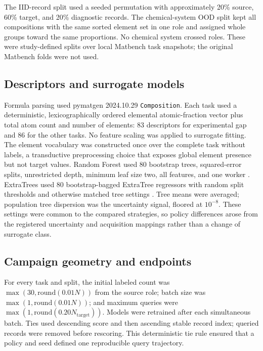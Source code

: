 \documentclass[10pt]{article}
\begin{document}
The IID-record split used a seeded permutation with approximately 20\% source,
60\% target, and 20\% diagnostic records. The chemical-system OOD split kept
all compositions with the same sorted element set in one role and assigned
whole groups toward the same proportions. No chemical system crossed roles.
These were study-defined splits over local Matbench task snapshots; the
original Matbench folds were not used.

\subsection{Descriptors and surrogate models}
Formula parsing used pymatgen 2024.10.29 \texttt{Composition}. Each task used
a deterministic, lexicographically ordered elemental atomic-fraction vector
plus total atom count and number of elements: 83 descriptors for experimental
gap and 86 for the other tasks. No feature scaling was applied to surrogate
fitting. The element vocabulary was constructed once over the complete task
without labels, a transductive preprocessing choice that exposes global
element presence but not target values. Random Forest used 80 bootstrap trees, squared-error splits,
unrestricted depth, minimum leaf size two, all features, and one worker
\citep{breiman2001rf,meinshausen2006qrf,wager2014confidence,mentch2016uncertainty}.
ExtraTrees used 80 bootstrap-bagged ExtraTree regressors with random split
thresholds and otherwise matched tree settings
\citep{geurts2006extratrees}. Tree means were averaged; population tree
dispersion was the uncertainty signal, floored at $10^{-8}$. These settings
were common to the compared strategies, so policy differences arose from the
registered uncertainty and acquisition mappings rather than a change of
surrogate class.

\subsection{Campaign geometry and endpoints}
For every task and split, the initial labeled count was
$\max(30,\mathrm{round}(0.01N))$ from the source role; batch size was
$\max(1,\mathrm{round}(0.01N))$; and maximum queries were
$\max(1,\mathrm{round}(0.20N_{\mathrm{target}}))$. Models were retrained after
each simultaneous batch. Ties used descending score and then ascending stable
record index; queried records were removed before rescoring. This deterministic
tie rule ensured that a policy and seed defined one reproducible query
trajectory.
\end{document}
